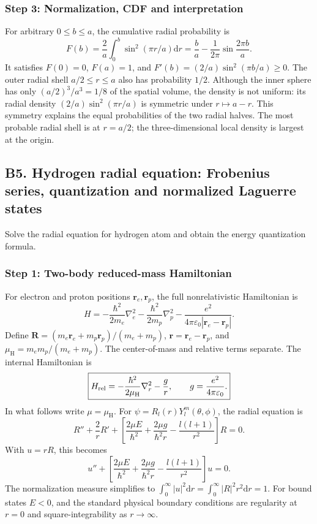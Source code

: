 \documentclass[11pt,a4paper]{article}
\newcommand{\dd}{\mathrm{d}}
\newcommand{\mH}{\mu_{\mathrm H}}
\newcommand{\eps}{\varepsilon_0}
\begin{document}
\subsubsection*{Step 3: Normalization, CDF and interpretation}
For arbitrary \(0\le b\le a\), the cumulative radial probability is
\begin{equation}\boxed{F(b)=\frac2a\int_0^b\sin^2(\pi r/a)\dd r=\frac ba-\frac1{2\pi}\sin\frac{2\pi b}{a}.}\end{equation}
It satisfies \(F(0)=0\), \(F(a)=1\), and \(F'(b)=(2/a)\sin^2(\pi b/a)\ge0\). The outer radial shell \(a/2\le r\le a\) also has probability \(1/2\). Although the inner sphere has only \((a/2)^3/a^3=1/8\) of the spatial volume, the density is not uniform: its radial density \((2/a)\sin^2(\pi r/a)\) is symmetric under \(r\mapsto a-r\). This symmetry explains the equal probabilities of the two radial halves. The most probable radial shell is at \(r=a/2\); the three-dimensional local density is largest at the origin.

\subsection{B5. Hydrogen radial equation: Frobenius series, quantization and normalized Laguerre states}
\begin{questionbox}Solve the radial equation for hydrogen atom and obtain the energy quantization formula.\end{questionbox}
\subsubsection*{Step 1: Two-body reduced-mass Hamiltonian}
For electron and proton positions \(\mathbf r_e,\mathbf r_p\), the full nonrelativistic Hamiltonian is
\begin{equation}H=-\frac{\hbar^2}{2m_e}\nabla_e^2-\frac{\hbar^2}{2m_p}\nabla_p^2-\frac{e^2}{4\pi\eps|\mathbf r_e-\mathbf r_p|}.\end{equation}
Define \(\mathbf R=(m_e\mathbf r_e+m_p\mathbf r_p)/(m_e+m_p)\), \(\mathbf r=\mathbf r_e-\mathbf r_p\), and \(\mH=m_em_p/(m_e+m_p)\). The center-of-mass and relative terms separate. The internal Hamiltonian is
\begin{equation}\boxed{H_{\rm rel}=-\frac{\hbar^2}{2\mH}\nabla_r^2-\frac gr,\qquad g=\frac{e^2}{4\pi\eps}.}\end{equation}
In what follows write \(\mu=\mH\). For \(\psi=R_l(r)Y_l^m(\theta,\phi)\), the radial equation is
\begin{equation}\boxed{R''+\frac2rR'+\left[\frac{2\mu E}{\hbar^2}+\frac{2\mu g}{\hbar^2r}-\frac{l(l+1)}{r^2}\right]R=0.}\end{equation}
With \(u=rR\), this becomes
\begin{equation}\boxed{u''+\left[\frac{2\mu E}{\hbar^2}+\frac{2\mu g}{\hbar^2r}-\frac{l(l+1)}{r^2}\right]u=0.}\end{equation}
The normalization measure simplifies to \(\int_0^\infty|u|^2\dd r=\int_0^\infty|R|^2r^2\dd r=1\). For bound states \(E<0\), and the standard physical boundary conditions are regularity at \(r=0\) and square-integrability as \(r\to\infty\).
\end{document}

